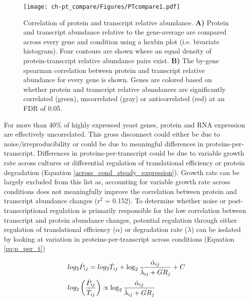 \begin{figure}[h!]
\begin{center}
\texttt{[image: ch-pt\_compare/Figures/PTcompare1.pdf]}
\caption[Correlation of protein and transcript relative abundance]{Correlation of protein and transcript relative abundance.  \textbf{A)} Protein and transcript abundance relative to the gene-average are compared across every gene and condition using a hexbin plot (i.e. bivariate histogram).  Four contours are shown where an equal density of protein-transcript relative abundance pairs exist.  \textbf{B)} The by-gene spearman correlation between protein and transcript relative abundance for every gene is shown.  Genes are colored based on whether protein and transcript relative abundances are significantly correlated (green), uncorrelated (gray) or anticorrelated (red) at an FDR of 0.05.}
\label{ptscatter}
\end{center}
\end{figure}

For more than 40\% of highly expressed yeast genes, protein and RNA expression are effectively uncorrelated.  This gross disconnect could either be due to noise/irreproducibility or could be due to meaningful differences in proteins-per-transcript. Differences in proteins-per-transcript could be due to variable growth rate across cultures or differential regulation of translational efficiency or protein degradation (Equation \ref{across_cond_steady_expression}).  Growth rate can be largely excluded from this list as, accounting for variable growth rate across conditions does not meaningfully improve the correlation between protein and transcript abundance changes (r$^{2}$ = 0.152).  To determine whether noise or post-transcriptional regulation is primarily responsible for the low correlation between transcript and protein abundance changes, potential regulation through either regulation of translational efficiency ($\alpha$) or degradation rate ($\lambda$) can be isolated by looking at variation in proteins-per-transcript across conditions (Equation \ref{eq:p_per_t})

\begin{align}
&log_{2}\dot{P}_{ij} = log_{2}\dot{T}_{ij} + \log_{2}\frac{\dot{\alpha}_{ij}}{\dot{\lambda}_{ij} + \dot{GR}_{j}} + C\notag\\
&log_{2}\left(\frac{\dot{P}_{ij}}{\dot{T}_{ij}}\right) \propto \log_{2}\frac{\dot{\alpha}_{ij}}{\dot{\lambda}_{ij} + \dot{GR}_{j}}\notag\\
\label{eq:p_per_t}
\end{align}

